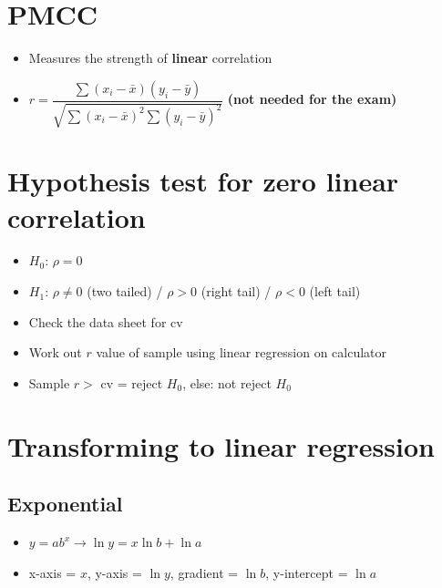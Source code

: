 \documentclass[oneside,fleqn,11pt]{book}
\begin{document}
	\section{PMCC}
	\begin{itemize}
		\item Measures the strength of \textbf{linear} correlation
		\item $r =\dfrac{\sum\left(x_{i}-\bar{x}\right)\left(y_{i}-\bar{y}\right)}{\sqrt{\sum\left(x_{i}-\bar{x}\right)^{2} \sum\left(y_{i}-\bar{y}\right)^{2}}}$ \textbf{(not needed for the exam)}
	\end{itemize}
	
	\section{Hypothesis test for zero linear correlation}
	\begin{itemize}
		\item $H_0$: $\rho = 0$
		\item $H_1$: $\rho \neq 0$ (two tailed) / $\rho > 0$ (right tail) / $\rho < 0$ (left tail)
		\item Check the data sheet for cv
		\item Work out $r$ value of sample using linear regression on calculator
		\item Sample $r >$ cv = reject $H_0$, else: not reject $H_0$
	\end{itemize}
	
	

	
	

	
	\section{Transforming to linear regression}
	\subsection{Exponential}
	\begin{itemize}
		\item $y=ab^x\rightarrow\ln y = x\ln b + \ln a$
		\item x-axis = $x$, y-axis = $\ln y$, gradient = $\ln b$, y-intercept = $\ln a$
	\end{itemize}
\end{document}
